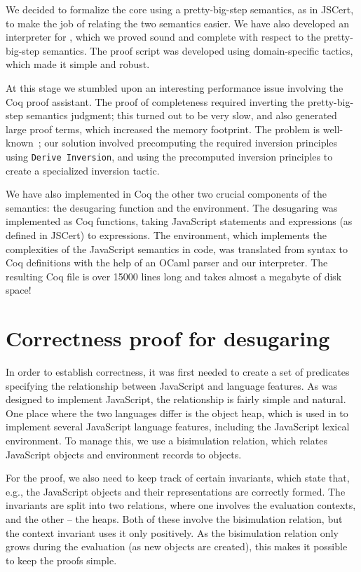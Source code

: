 \documentclass{sigplanconf}
\begin{document}
We decided to formalize the \lambdajs{} core using a
pretty-big-step semantics, as in JSCert, to make the job of
relating the two semantics easier. We have also developed
an interpreter for \lambdajs{}, which we proved sound and
complete with respect to the pretty-big-step semantics.
The proof script was developed using domain-specific tactics,
which made it simple and robust.

At this stage we stumbled upon an interesting performance issue 
involving the Coq proof assistant. The proof of completeness required
inverting the pretty-big-step semantics judgment; this turned out
to be very slow, and also generated large proof terms, which increased
the memory footprint. The problem is well-known~\cite{Monin:Coq2}; 
our solution involved
precomputing the required inversion principles using
\texttt{Derive Inversion}, and using the precomputed inversion
principles to create a specialized inversion tactic.

We have also implemented in Coq the other two crucial components
of the \lambdajs{} semantics: the desugaring function and the 
environment. The desugaring was implemented as Coq functions,
taking JavaScript statements and expressions (as defined in
JSCert) to \lambdajs{} expressions. The environment, which
implements the complexities of the JavaScript semantics
in \lambdajs{} code, was translated from \lambdajs{} syntax
to Coq definitions with the help of an OCaml parser and
our interpreter. The resulting Coq file is over 15000 lines long
and takes almost a megabyte of disk space!

\section{Correctness proof for \lambdajs{} desugaring}

In order to establish correctness, it was first needed to create
a set of predicates specifying the relationship between 
JavaScript and \lambdajs{} language features. As \lambdajs{} was
designed to implement JavaScript, the relationship is fairly
simple and natural. One place where the two languages differ
is the object heap, which is used in \lambdajs{} to implement
several JavaScript language features, including the
JavaScript lexical environment. To manage this, we use a bisimulation
relation, which relates JavaScript objects and environment records
to \lambdajs{} objects.

For the proof, we also need to keep track of certain invariants,
which state that, e.g., the JavaScript objects and their
\lambdajs{} representations are correctly formed. 
The invariants are split into two relations, where one
involves the evaluation contexts, and the other -- the heaps.
Both of these involve the bisimulation relation, but the
context invariant uses it only positively. As the bisimulation
relation only grows during the evaluation (as new objects
are created), this makes it possible to keep the proofs simple.
\end{document}
